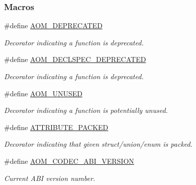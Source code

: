 \subsubsection*{Macros}
\begin{DoxyCompactItemize}
\item 
\mbox{\label{group__codec_gac06f52752a93708c56eb660f27601b00}} 
\#define \hyperlink{group__codec_gac06f52752a93708c56eb660f27601b00}{A\+O\+M\+\_\+\+D\+E\+P\+R\+E\+C\+A\+T\+ED}
\begin{DoxyCompactList}\small\item\em Decorator indicating a function is deprecated. \end{DoxyCompactList}\item 
\#define \hyperlink{group__codec_gad4bd9523583de840a940dbedb6a34d58}{A\+O\+M\+\_\+\+D\+E\+C\+L\+S\+P\+E\+C\+\_\+\+D\+E\+P\+R\+E\+C\+A\+T\+ED}
\begin{DoxyCompactList}\small\item\em Decorator indicating a function is deprecated. \end{DoxyCompactList}\item 
\mbox{\label{group__codec_ga999502c6c00ce4c54d0069265a31d2bb}} 
\#define \hyperlink{group__codec_ga999502c6c00ce4c54d0069265a31d2bb}{A\+O\+M\+\_\+\+U\+N\+U\+S\+ED}
\begin{DoxyCompactList}\small\item\em Decorator indicating a function is potentially unused. \end{DoxyCompactList}\item 
\mbox{\label{group__codec_gad93e9ac33d1a9153bbea517a98260041}} 
\#define \hyperlink{group__codec_gad93e9ac33d1a9153bbea517a98260041}{A\+T\+T\+R\+I\+B\+U\+T\+E\+\_\+\+P\+A\+C\+K\+ED}
\begin{DoxyCompactList}\small\item\em Decorator indicating that given struct/union/enum is packed. \end{DoxyCompactList}\item 
\mbox{\label{group__codec_ga801627e3edca037cef7a92f7fecd75ef}} 
\#define \hyperlink{group__codec_ga801627e3edca037cef7a92f7fecd75ef}{A\+O\+M\+\_\+\+C\+O\+D\+E\+C\+\_\+\+A\+B\+I\+\_\+\+V\+E\+R\+S\+I\+ON}
\begin{DoxyCompactList}\small\item\em Current A\+BI version number. \end{DoxyCompactList}\item 

\end{DoxyCompactItemize}
